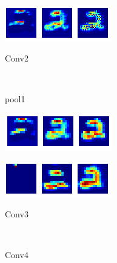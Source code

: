 \begin{frame}[plain]
\begin{figure}
\begin{subfigure}{0.3\textwidth}
\includegraphics[width=\textwidth]{deep_cnn_2_conv}
\end{subfigure}
\begin{subfigure}{0.1\textwidth}
\caption*{Conv2}
\end{subfigure}
\\
\begin{subfigure}{0.1\textwidth}
\caption*{pool1}
\end{subfigure}
\begin{subfigure}{0.3\textwidth}
\includegraphics[width=\textwidth]{deep_cnn_1_pool}
\end{subfigure}
\hspace{1cm}
\begin{subfigure}{0.3\textwidth}
\includegraphics[width=\textwidth]{deep_cnn_3_conv}
\end{subfigure}
\begin{subfigure}{0.1\textwidth}
\caption*{Conv3}
\end{subfigure}
\\
\begin{subfigure}{0.1\textwidth}
\caption*{Conv4}
\end{subfigure}
\begin{subfigure}{0.3\textwidth}

\end{subfigure}
\end{figure}
\end{frame}
